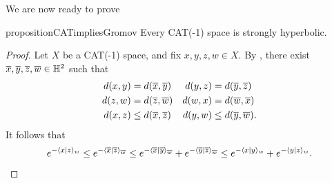 We are now ready to prove
\begin{repproposition}{propositionCATimpliesGromov}
Every CAT(-1) space is strongly hyperbolic.
\end{repproposition}
\begin{proof}
Let $X$ be a CAT(-1) space, and fix $x,y,z,w\in X$. By \cite[Proposition II.1.11]{BridsonHaefliger}, there exist $\wbar x,\wbar y,\wbar z,\wbar w\in \H^2$ such that
\begin{align*}
d(x,y) &= d(\overline x,\overline y) &
d(y,z) &= d(\overline y,\overline z)\\
d(z,w) &= d(\overline z,\overline w) &
d(w,x) &= d(\overline w,\overline x)\\
d(x,z) &\leq d(\overline x,\overline z) &
d(y,w) &\leq d(\overline y,\overline w).
\end{align*}
It follows that
\[
e^{-\langle x|z\rangle_w} \leq e^{-\langle \overline x|\overline z\rangle_{\overline w}} \leq e^{-\langle \overline x|\overline y\rangle_{\overline w}} + e^{-\langle \overline y|\overline z\rangle_{\overline w}} \leq e^{-\langle x|y\rangle_w} + e^{-\langle y|z\rangle_w}.
\]
%
%
%
%
%

\end{proof}
